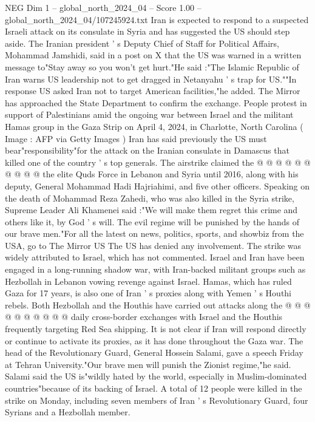 \begin{textsample}{NEG Dim 1 – global\_north\_2024\_04 – Score 1.00 – global\_north\_2024\_04/107245924.txt}  \label{ex:f1_neg_253}
Iran is expected to respond to a suspected Israeli attack on its consulate in Syria and has suggested the US should step aside.
The Iranian president ' s Deputy Chief of Staff for Political Affairs, Mohammad Jamshidi, said in a post on X that the US was warned in a written message to"Stay away so you won't get hurt."He said :"The Islamic Republic of Iran warns US leadership not to get dragged in Netanyahu ' s trap for US.""In response US asked Iran not to target American facilities,"he added.
The Mirror has approached the State Department to confirm the exchange.
People protest in support of Palestinians amid the ongoing war between Israel and the militant Hamas group in the Gaza Strip on April 4, 2024, in Charlotte, North Carolina ( Image : AFP via Getty Images ) Iran has said previously the US must bear"responsibility"for the attack on the Iranian consulate in Damascus that killed one of the country ' s top generals.
The airstrike claimed the @ @ @ @ @ @ @ @ @ @ the elite Quds Force in Lebanon and Syria until 2016, along with his deputy, General Mohammad Hadi Hajriahimi, and five other officers.
Speaking on the death of Mohammad Reza Zahedi, who was also killed in the Syria strike, Supreme Leader Ali Khamenei said :"We will make them regret this crime and others like it, by God ' s will.
The evil regime will be punished by the hands of our brave men."For all the latest on news, politics, sports, and showbiz from the USA, go to The Mirror US The US has denied any involvement.
The strike was widely attributed to Israel, which has not commented.
Israel and Iran have been engaged in a long-running shadow war, with Iran-backed militant groups such as Hezbollah in Lebanon vowing revenge against Israel.
Hamas, which has ruled Gaza for 17 years, is also one of Iran ' s proxies along with Yemen ' s Houthi rebels.
Both Hezbollah and the Houthis have carried out attacks along the @ @ @ @ @ @ @ @ @ @ daily cross-border exchanges with Israel and the Houthis frequently targeting Red Sea shipping.
It is not clear if Iran will respond directly or continue to activate its proxies, as it has done throughout the Gaza war.
The head of the Revolutionary Guard, General Hossein Salami, gave a speech Friday at Tehran University."Our brave men will punish the Zionist regime,"he said.
Salami said the US is"wildly hated by the world, especially in Muslim-dominated countries"because of its backing of Israel.
A total of 12 people were killed in the strike on Monday, including seven members of Iran ' s Revolutionary Guard, four Syrians and a Hezbollah member.

\end{textsample}
